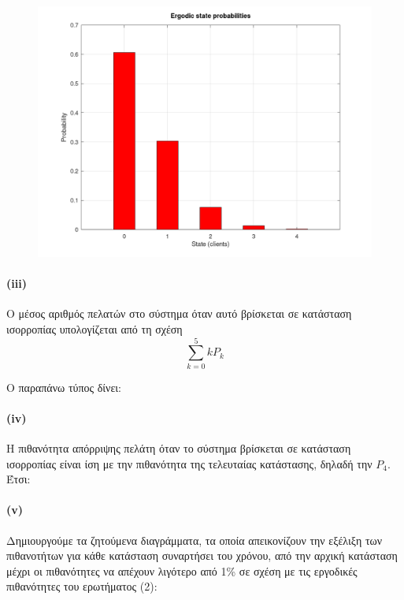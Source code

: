 \documentclass[a4paper]{article}
\begin{document}
\begin{figure}[H]
	\begin{center}
		\includegraphics[width=\textwidth]{files/3bii.png}
	\end{center}
\end{figure}

\paragraph{(iii)}

Ο μέσος αριθμός πελατών στο σύστημα όταν αυτό βρίσκεται σε κατάσταση ισορροπίας υπολογίζεται από τη σχέση 
\[
	\sum_{k=0}^5 kP_k 
\]

Ο παραπάνω τύπος δίνει: 



\paragraph{(iv)}

Η πιθανότητα απόρριψης πελάτη όταν το σύστημα βρίσκεται σε κατάσταση ισορροπίας είναι ίση με την πιθανότητα της τελευταίας κατάστασης, δηλαδή την $ P_4 $. Έτσι:



\paragraph{(v)}

Δημιουργούμε τα ζητούμενα διαγράμματα, τα οποία απεικονίζουν την εξέλιξη των πιθανοτήτων για κάθε κατάσταση συναρτήσει του χρόνου, από την αρχική κατάσταση μέχρι οι πιθανότητες να απέχουν λιγότερο από 1\% σε σχέση με τις εργοδικές πιθανότητες του ερωτήματος (2):
\end{document}
